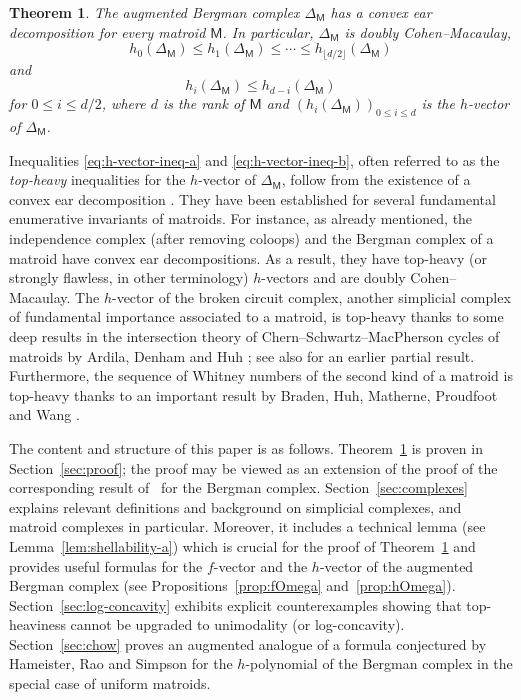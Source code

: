 \documentclass[11pt]{amsart}
\theoremstyle{theorems}
\newtheorem{theorem}{Theorem}[section]
\theoremstyle{definition}
\newcommand{\M}{{\mathsf{M}}}
\begin{document}
\begin{theorem} \label{thm:main}
    The augmented Bergman complex $\Delta_{\M}$ has a 
    convex ear decomposition for every matroid $\M$. 
    In particular, $\Delta_{\M}$ is doubly Cohen--Macaulay,
    \begin{equation} \label{eq:h-vector-ineq-a}
    h_0(\Delta_{\M}) \le h_1(\Delta_{\M}) \le \cdots \le
    h_{\lfloor d/2 \rfloor}(\Delta_{\M})
    \end{equation}
    and
    \begin{equation} \label{eq:h-vector-ineq-b}
    h_i(\Delta_{\M}) \le h_{d-i}(\Delta_{\M})
    \end{equation}
    for $0 \le i \le d/2$, where $d$ is the rank of $\M$ and
		$(h_i(\Delta_{\M}))_{0 \le i \le d}$ is the $h$-vector 
		of $\Delta_{\M}$.
\end{theorem}

Inequalities \eqref{eq:h-vector-ineq-a} and \eqref{eq:h-vector-ineq-b}, 
often referred to as the \emph{top-heavy} inequalities for the $h$-vector 
of $\Delta_{\M}$, follow from the existence of a convex ear decomposition
\cite{Ch97}. They have been established for several fundamental 
enumerative invariants of matroids. For instance, as already mentioned, 
the independence complex (after removing coloops) and the Bergman complex 
of a matroid have convex ear decompositions. As a result, they have 
top-heavy (or strongly flawless, in other terminology) $h$-vectors and 
are doubly Cohen--Macaulay. The $h$-vector of the broken circuit 
complex, another simplicial complex of fundamental importance associated 
to a matroid, is top-heavy thanks to some deep results in the intersection 
theory of Chern--Schwartz--MacPherson cycles of matroids by Ardila, Denham 
and Huh \cite{ADH23}; see also \cite{KV16} for an earlier partial result. 
Furthermore, the sequence of Whitney numbers of the second kind of a 
matroid is top-heavy thanks to an important result by Braden, Huh, 
Matherne, Proudfoot and Wang \cite[Theorem~1.1]{BHMPW2}.

The content and structure of this paper is as follows. 
Theorem~\ref{thm:main} is proven in Section~\ref{sec:proof}; the proof 
may be viewed as an extension of the proof of the corresponding result 
of~\cite{NS04} for the Bergman complex. Section~\ref{sec:complexes} 
explains relevant definitions and background on simplicial complexes, 
and matroid complexes in particular. Moreover, it includes a technical 
lemma (see Lemma~\ref{lem:shellability-a}) which is crucial for the 
proof of Theorem~\ref{thm:main} and provides useful formulas for the 
$f$-vector and the $h$-vector of the augmented Bergman complex (see 
Propositions~\ref{prop:fOmega} and~\ref{prop:hOmega}). 
Section~\ref{sec:log-concavity} exhibits explicit counterexamples showing that top-heaviness cannot be upgraded to unimodality (or log-concavity).
Section~\ref{sec:chow} proves 
an augmented analogue of a formula conjectured by Hameister, Rao and 
Simpson \cite{HRS21} for the $h$-polynomial of the Bergman complex 
in the special case of uniform matroids.
\end{document}
